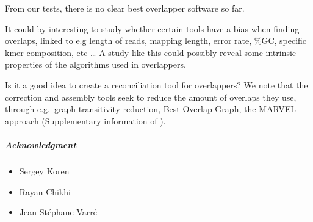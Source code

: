 \documentclass[./main.tex]{subfiles}
\begin{document}
From our tests, there is no clear best overlapper software so far.

It could by interesting to study whether certain tools have a bias when
finding overlaps, linked to e.g length of reads, mapping length, error
rate, \%GC, specific kmer composition, etc \ldots{} A study like this
could possibly reveal some intrinsic properties of the algorithms used
in overlappers.

Is it a good idea to create a reconciliation tool for overlappers? We
note that the correction and assembly tools seek to reduce the amount of
overlaps they use, through e.g.~graph transitivity reduction, Best
Overlap Graph, the MARVEL approach (Supplementary information of \cite{MARVEL}).

\subparagraph{Acknowledgment}\label{preassembly:ovl:acknowledgment}

\begin{itemize}
\item Sergey Koren
\item Rayan Chikhi
\item Jean-Stéphane Varré
\end{itemize}
\end{document}
